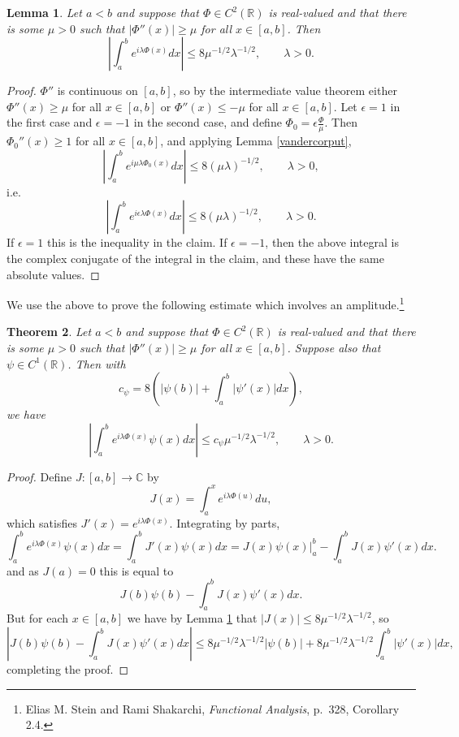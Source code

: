 \documentclass{article}
\newtheorem{theorem}{Theorem}
\newtheorem{lemma}[theorem]{Lemma}
\theoremstyle{definition}
\begin{document}
\begin{lemma}
Let $a<b$ and suppose that $\Phi \in C^2(\mathbb{R})$ is real-valued and that there is some $\mu>0$ such that
$|\Phi''(x)| \geq \mu$ for all $x \in [a,b]$.  Then
\[
\left| \int_a^b e^{i\lambda \Phi(x)} dx\right|  \leq 8\mu^{-1/2}   \lambda^{-1/2}, \qquad \lambda>0.
\]
\label{vandercorputmu}
\end{lemma}
\begin{proof}
$\Phi''$ is continuous on $[a,b]$, so by the intermediate value theorem  either $\Phi''(x) \geq \mu$ for all  $x \in [a,b]$ or $\Phi''(x) \leq -\mu$ for all  $x\in [a,b]$. 
Let $\epsilon=1$ in the first case and $\epsilon=-1$ in the second case, and define $\Phi_0=\epsilon \frac{\Phi}{\mu}$. 
Then $\Phi_0''(x) \geq 1$ for all $x \in [a,b]$, and
applying Lemma \ref{vandercorput},
\[
\left| \int_a^b e^{i \mu \lambda \Phi_0(x)} dx \right| \leq 8 (\mu \lambda)^{-1/2}, \qquad \lambda>0,
\]
i.e.
\[
\left| \int_a^b e^{i\epsilon \lambda \Phi(x)} dx \right| \leq 8(\mu \lambda)^{-1/2}, \qquad \lambda>0.
\]
If $\epsilon=1$ this is the inequality in the claim. If $\epsilon=-1$, then the above integral is the complex conjugate of the integral in the claim, and these have the same
absolute values.
\end{proof}


We use the above  to prove the following estimate which involves an amplitude.\footnote{Elias M. Stein and Rami Shakarchi, {\em Functional Analysis}, p.~328, Corollary 2.4.}

\begin{theorem}
Let $a<b$ and suppose that $\Phi \in C^2(\mathbb{R})$ is real-valued and that there is some $\mu>0$ such that
 $|\Phi''(x)| \geq \mu$ for all $x \in [a,b]$.
Suppose also that $\psi \in C^1(\mathbb{R})$. 
  Then
  with
\[
c_\psi = 8\left(|\psi(b)|+\int_a^b |\psi'(x)| dx\right),
\]
we have
\[
\left| \int_a^b e^{i\lambda \Phi(x)} \psi(x) dx \right| \leq c_\psi \mu^{-1/2} \lambda^{-1/2}, \qquad \lambda>0.
\]
\label{squarerootamplitude}
\end{theorem}
\begin{proof}
Define $J:[a,b] \to \mathbb{C}$ by 
\[
J(x) = \int_a^x e^{i\lambda \Phi(u)} du,
\]
which satisfies $J'(x)=e^{i\lambda \Phi(x)}$.
Integrating by parts,
\[
\int_a^b e^{i\lambda \Phi(x)} \psi(x) dx = \int_a^b J'(x) \psi(x) dx =
J(x)\psi(x) \bigg|_a^b -\int_a^b J(x) \psi'(x) dx.
\]
and as $J(a)=0$ this is equal to
\[
J(b)\psi(b)-\int_a^b J(x) \psi'(x) dx.
\]
But for each $x \in [a,b]$ we have by Lemma \ref{vandercorputmu} that $|J(x)| \leq 8\mu^{-1/2} \lambda^{-1/2}$, so 
\[
\left| J(b)\psi(b)-\int_a^b J(x) \psi'(x) dx \right|
\leq 8\mu^{-1/2}\lambda^{-1/2} |\psi(b)| + 8\mu^{-1/2}\lambda^{-1/2} \int_a^b |\psi'(x)| dx,
\]
completing the proof.
\end{proof}
\end{document}
